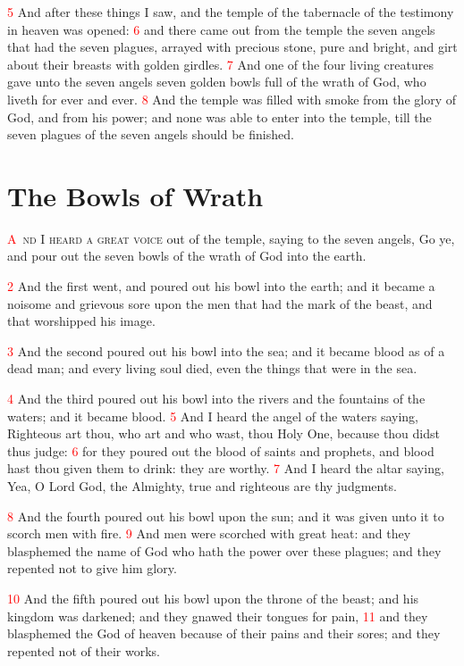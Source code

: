 \documentclass[12pt,twoside]{memoir}
\newcommand{\vnum}[1]{\textcolor{red}{\normalsize{#1}}}
\begin{document}
\vnum{5} And after these things I saw, and the temple of the tabernacle of the testimony in heaven was opened: 
\vnum{6} and there came out from the temple the seven angels that had the seven plagues, arrayed with precious stone, pure and bright, and girt about their breasts with golden girdles. 
\vnum{7} And one of the four living creatures gave unto the seven angels seven golden bowls full of the wrath of God, who liveth for ever and ever. 
\vnum{8} And the temple was filled with smoke from the glory of God, and from his power; and none was able to enter into the temple, till the seven plagues of the seven angels should be finished.


\chapter{The Bowls of Wrath}
\lettrine[lines=3,slope=-0.5em]{\textcolor{red}{A}}{\ nd I heard a great voice} out of the temple, saying to the seven angels, Go ye, and pour out the seven bowls of the wrath of God into the earth.

\vnum{2} And the first went, and poured out his bowl into the earth; and it became a noisome and grievous sore upon the men that had the mark of the beast, and that worshipped his image.

\vnum{3} And the second poured out his bowl into the sea; and it became blood as of a dead man; and every living soul died, even the things that were in the sea.

\vnum{4} And the third poured out his bowl into the rivers and the fountains of the waters; and it became blood. 
\vnum{5} And I heard the angel of the waters saying, Righteous art thou, who art and who wast, thou Holy One, because thou didst thus judge: 
\vnum{6} for they poured out the blood of saints and prophets, and blood hast thou given them to drink: they are worthy. 
\vnum{7} And I heard the altar saying, Yea, O Lord God, the Almighty, true and righteous are thy judgments.

\vnum{8} And the fourth poured out his bowl upon the sun; and it was given unto it to scorch men with fire. 
\vnum{9} And men were scorched with great heat: and they blasphemed the name of God who hath the power over these plagues; and they repented not to give him glory.

\vnum{10} And the fifth poured out his bowl upon the throne of the beast; and his kingdom was darkened; and they gnawed their tongues for pain, 
\vnum{11} and they blasphemed the God of heaven because of their pains and their sores; and they repented not of their works.
\end{document}
